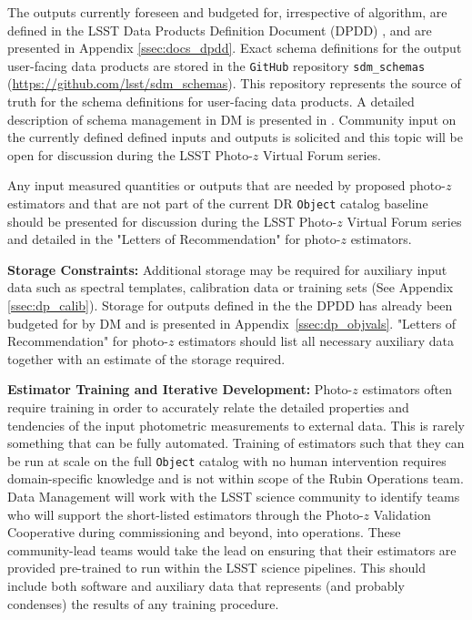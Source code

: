 \documentclass[DM,lsstdraft,toc]{lsstdoc}
\begin{document}
The outputs currently foreseen and budgeted for, irrespective of algorithm, are defined in the LSST Data Products Definition Document (DPDD) \cite{LSE-163}, and are presented in Appendix \ref{ssec:docs_dpdd}. 
Exact schema definitions for the output user-facing data products are stored in the {\tt GitHub} repository {\tt sdm\_schemas} (\url{https://github.com/lsst/sdm\_schemas}). 
This repository represents the source of truth for the schema definitions for user-facing data products.
A detailed description of schema management in DM is presented in \cite{dmtn-153}. 
Community input on the currently defined defined inputs and outputs is solicited and this topic will be open for discussion during the LSST Photo-$z$ Virtual Forum series. 

Any input measured quantities or outputs that are needed by proposed photo-$z$ estimators and that are not part of the current DR {\tt Object} catalog baseline should be presented for discussion during the LSST Photo-$z$ Virtual Forum series and detailed in the "Letters of Recommendation" for photo-$z$ estimators. 

\textbf{Storage Constraints:}
Additional storage may be required for auxiliary input data such as spectral templates, calibration data or training sets (See Appendix \ref{ssec:dp_calib}). 
Storage for outputs defined in the the DPDD \cite{LSE-163} has already been budgeted for by DM and is presented in Appendix~\ref{ssec:dp_objvals}. 
"Letters of Recommendation" for photo-$z$ estimators should list all necessary auxiliary data together with an estimate of the storage required.

\textbf{Estimator Training and Iterative Development:}
Photo-$z$ estimators often require training in order to accurately relate the detailed properties and tendencies of the input photometric measurements to external data.
This is rarely something that can be fully automated.
Training of estimators such that they can be run at scale on the full {\tt Object} catalog with no human intervention requires domain-specific knowledge and is not within scope of the Rubin Operations team. 
Data Management will work with the LSST science community to identify teams who will support the short-listed estimators through the Photo-$z$ Validation Cooperative during commissioning and beyond, into operations.
These community-lead teams would take the lead on ensuring that their estimators are provided pre-trained to run within the LSST science pipelines. 
This should include both software and auxiliary data that represents (and probably condenses) the results of any training procedure.
\end{document}
